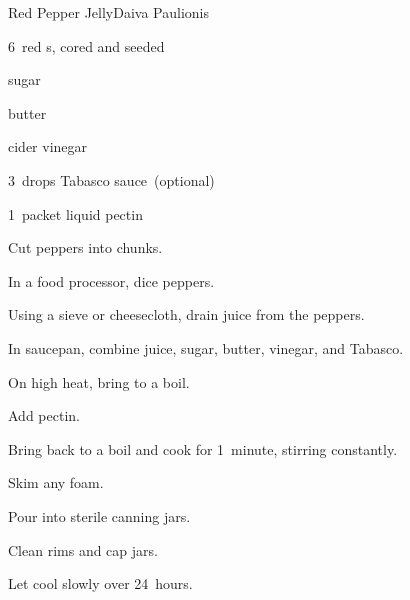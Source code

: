 \begin{recipe}{Red Pepper Jelly}{Daiva Paulionis}{\C{3\half}}

\begin{ingredients}
\item 6~red s, cored and seeded
\item {} sugar
\item \tp{\eighth} butter
\item \C{\half} cider vinegar
\item 3~drops Tabasco sauce~(optional)
\item 1~packet liquid pectin
\end{ingredients}

\begin{directions}
\item Cut peppers into chunks.
\item In a food processor, dice peppers.
\item Using a sieve or cheesecloth, drain  juice from the peppers.
\item In saucepan, combine juice, sugar, butter, vinegar, and Tabasco.
\item On high heat, bring to a boil.
\item Add pectin.
\item Bring back to a boil and cook for 1~minute, stirring constantly.
\item Skim any foam.
\item Pour into sterile canning jars.
\item Clean rims and cap jars.
\item Let cool slowly over 24~hours.
\end{directions}

\end{recipe}
